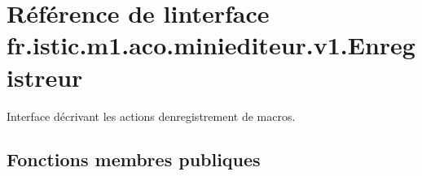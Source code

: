 \hypertarget{interfacefr_1_1istic_1_1m1_1_1aco_1_1miniediteur_1_1v1_1_1Enregistreur}{}\section{Référence de l\textquotesingle{}interface fr.\+istic.\+m1.\+aco.\+miniediteur.\+v1.\+Enregistreur}
\label{interfacefr_1_1istic_1_1m1_1_1aco_1_1miniediteur_1_1v1_1_1Enregistreur}


Interface décrivant les actions d\textquotesingle{}enregistrement de macros.  


\subsection*{Fonctions membres publiques}
